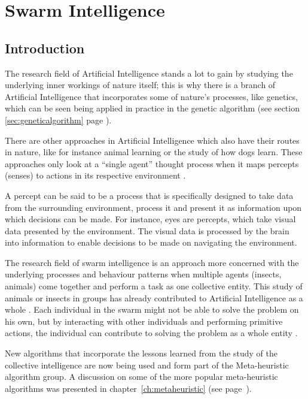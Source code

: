 \chapter{Swarm Intelligence}
\label{chpt:swarm}
\section{Introduction}
The research field of Artificial Intelligence stands a lot to gain by studying the underlying inner workings of nature itself; this is why there is a branch of Artificial Intelligence that incorporates some of nature’s processes, like genetics, which can be seen being applied in practice in the genetic algorithm (see section \ref{sec:geneticalgorithm} page \pageref{sec:geneticalgorithm}).

 There are other approaches in Artificial Intelligence which also have their routes in nature, like for instance animal learning or the study of how dogs learn\cite{DLearning}. These approaches only look at a “single agent” thought process when it maps percepts (senses) to actions in its respective environment \cite{DLearning}. 
 
 A percept can be said to be a process that is specifically designed to take data from the surrounding environment, process it and present it as information upon which decisions can be made\cite{DLearning,AIModernApproach}. For instance, eyes are percepts, which take visual data presented by the environment\cite{DLearning,AIModernApproach}. The visual data is processed by the brain into information to enable decisions to be made on navigating the environment\cite{DLearning,AIModernApproach}.

The research field of swarm intelligence is an approach more concerned with the underlying processes and behaviour patterns when multiple agents (insects, animals) come together and perform a task as one collective entity\cite{DLearning,AIModernApproach,ChaoticSwarmIntel,BeeJobShop}.  This study of animals or insects in groups has already contributed to Artificial Intelligence as a whole \cite{ChaoticSwarmIntel,BeeJobShop}. Each individual in the swarm might not be able to solve the problem on his own, but by interacting with other individuals and performing primitive actions, the individual can contribute to solving the problem as a whole entity \cite{BeeJobShop}. 

New algorithms that incorporate the lessons learned from the study of the collective intelligence are now being used and form part of the Meta-heuristic algorithm group. A discussion on some of the more popular meta-heuristic algorithms was presented in chapter~\ref{ch:metaheuristic} (see page~\pageref{ch:metaheuristic}).

